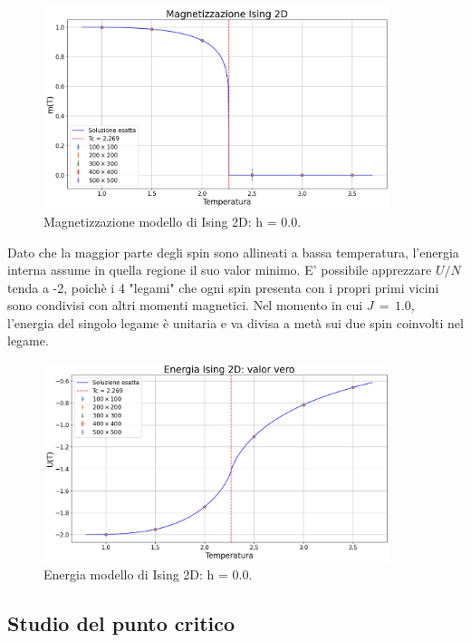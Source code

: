 \begin{figure}[H]
    \centering
    \includegraphics[width=0.9\textwidth]{Immagini/simIsing2D/magn.png}
    \caption{Magnetizzazione modello di Ising 2D: h = 0.0.}
    \label{fig: magn_Ising2D}
\end{figure}

Dato che la maggior parte degli spin sono allineati a bassa temperatura, l'energia interna assume in quella regione il suo valor minimo. 
E' possibile apprezzare $U/N$ tenda a -2, poichè i 4 "legami" che ogni spin presenta con i propri primi vicini sono condivisi con altri 
momenti magnetici. Nel momento in cui $J\,=\,1.0$, l'energia del singolo legame è unitaria e va divisa a metà sui due spin coinvolti nel 
legame.

\begin{figure}[H]
    \centering
    \includegraphics[width=0.9\textwidth]{Immagini/simIsing2D/ene.png}
    \caption{Energia modello di Ising 2D: h = 0.0.}
    \label{fig: ene_Ising2D}
\end{figure}


\subsection{Studio del punto critico}

\newpage
